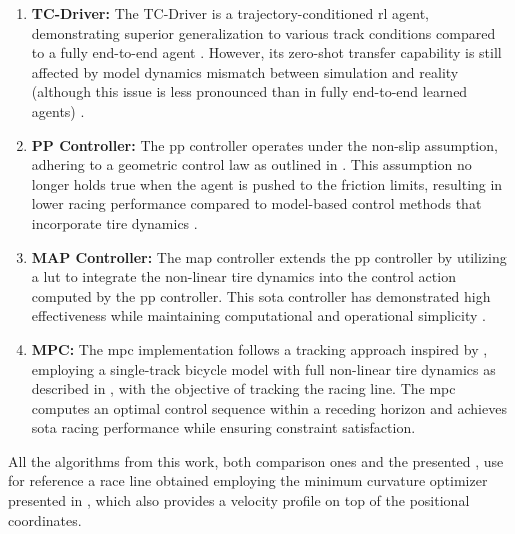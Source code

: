 \documentclass[letterpaper, conference]{IEEEtran}
\begin{document}
\begin{enumerate}[I]
    \item \textbf{TC-Driver:} The TC-Driver is a trajectory-conditioned \gls{rl} agent, demonstrating superior generalization to various track conditions compared to a fully end-to-end agent \cite{Ghignone2023tcdriver}. However, its zero-shot transfer capability is still affected by model dynamics mismatch between simulation and reality (although this issue is less pronounced than in fully end-to-end learned agents) \cite{Ghignone2023tcdriver}. 
    
   \item \textbf{PP Controller:} The \gls{pp} controller \cite{purepursuit} operates under the non-slip assumption, adhering to a geometric control law as outlined in . This assumption no longer holds true when the agent is pushed to the friction limits, resulting in lower racing performance compared to model-based control methods that incorporate tire dynamics \cite{map}.

    \item \textbf{MAP Controller:} The \gls{map} controller \cite{map} extends the \gls{pp} controller by utilizing a \gls{lut} to integrate the non-linear tire dynamics into the control action computed by the \gls{pp} controller. This \gls{sota} controller has demonstrated high effectiveness while maintaining computational and operational simplicity \cite{map, forzaeth}.
    
    \item \textbf{MPC:} The \gls{mpc} implementation follows a tracking approach inspired by \cite{hierarchicalmpc}, employing a single-track bicycle model with full non-linear tire dynamics as described in \cite{hierarchicalmpc}, with the objective of tracking the racing line. The \gls{mpc} computes an optimal control sequence within a receding horizon and achieves \gls{sota} racing performance while ensuring constraint satisfaction.

\end{enumerate}
All the algorithms from this work, both comparison ones and the presented {\namealgo}, use for reference a race line obtained employing the minimum curvature optimizer presented in \cite{Heilmeier2020MinimumCar}, which also provides a velocity profile on top of the positional coordinates. 
\end{document}
